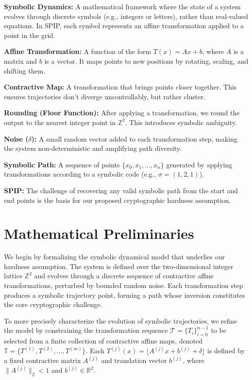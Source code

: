 \documentclass[twocolumn,10pt]{article}
\begin{document}
\begin{tcolorbox}[title=\textbf{Conceptual Primer: Symbolic Dynamics and SPIP}, colframe=accent, coltitle=black, fonttitle=\bfseries]
\textbf{Symbolic Dynamics:} A mathematical framework where the state of a system evolves through discrete symbols (e.g., integers or letters), rather than real-valued equations. In SPIP, each symbol represents an affine transformation applied to a point in the grid.

\textbf{Affine Transformation:} A function of the form $T(x) = A x + b$, where $A$ is a matrix and $b$ is a vector. It maps points to new positions by rotating, scaling, and shifting them.

\textbf{Contractive Map:} A transformation that brings points closer together. This ensures trajectories don’t diverge uncontrollably, but rather cluster.

\textbf{Rounding (Floor Function):} After applying a transformation, we round the output to the nearest integer point in $\mathbb{Z}^2$. This introduces symbolic ambiguity.

\textbf{Noise ($\delta$):} A small random vector added to each transformation step, making the system non-deterministic and amplifying path diversity.

\textbf{Symbolic Path:} A sequence of points $\{x_0, x_1, ..., x_n\}$ generated by applying transformations according to a symbolic code (e.g., $\sigma = (1,2,1)$).

\textbf{SPIP:} The challenge of recovering any valid symbolic path from the start and end points is the basis for our proposed cryptographic hardness assumption.
\end{tcolorbox}


\section{Mathematical Preliminaries} \label{sec:preliminaries}
\vspace{0.8em}

We begin by formalizing the symbolic dynamical model that underlies our hardness assumption. The system is defined over the two-dimensional integer lattice $\mathbb{Z}^2$ and evolves through a discrete sequence of contractive affine transformations, perturbed by bounded random noise. Each transformation step produces a symbolic trajectory point, forming a path whose inversion constitutes the core cryptographic challenge.

To more precisely characterize the evolution of symbolic trajectories, we refine the model by constraining the transformation sequence $\mathcal{T} = \{T_i\}_{i=0}^{n-1}$ to be selected from a finite collection of contractive affine maps, denoted $\mathbb{T} = \{T^{(1)}, T^{(2)}, ..., T^{(m)}\}$. Each $T^{(j)}(x) = \lfloor A^{(j)} x + b^{(j)} + \delta \rfloor$ is defined by a fixed contractive matrix $A^{(j)}$ and translation vector $b^{(j)}$, where $\|A^{(j)}\|_2 < 1$ and $b^{(j)} \in \mathbb{R}^2$.
\end{document}
